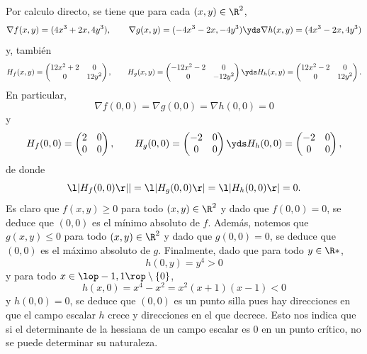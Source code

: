 \documentclass[a4,11pt]{aleph-examen}
\begin{document}
\begin{preguntas}
\begin{respuesta}
\begin{respuesta}
\begin{respuesta}
\begin{enumerate}
\begin{respuesta}
    Por calculo directo, se tiene que para cada $(x,y)\in\R^2$,
    \[
        \nabla f(x,y)=(4x^3+2x,4y^3),
        \qquad
        \nabla g(x,y)=(-4x^3-2x,-4y^3)
        \yds
        \nabla h(x,y)=(4x^3-2x,4y^3)
    \]
    y, también
    \[
        H_f(x,y)=
        \begin{pmatrix}
        12x^2+2&0\\
        0&12y^2\\
    \end{pmatrix},
    \qquad
    H_g(x,y)=
    \begin{pmatrix}
        -12x^2-2&0\\
        0&-12y^2\\
    \end{pmatrix}
    \yds
    H_h(x,y)=
    \begin{pmatrix}
        12x^2-2&0\\
        0&12y^2
    \end{pmatrix}.
    \]
    En particular,
    \[
        \nabla f(0,0)=\nabla g(0,0)=\nabla h(0,0)=0
    \]
    y
    \[
        H_f(0,0)=
        \begin{pmatrix}
        2&0\\
        0&0\\
    \end{pmatrix},
    \qquad
    H_g(0,0)=
    \begin{pmatrix}
        -2&0\\
        0&0\\
    \end{pmatrix}
    \yds
    H_h(0,0)=
    \begin{pmatrix}
        -2&0\\
        0&0
    \end{pmatrix},
    \]
    de donde
    \[
        \l|H_f(0,0)\r||=\l|H_g(0,0)\r|=\l|H_h(0,0)\r|=0.
    \]
    Es claro que $f(x,y)\geq 0$ para todo $(x,y)\in\R^2$ y dado que $f(0,0)=0$, se deduce que $(0,0)$ es el mínimo absoluto de $f$. Además, notemos que $g(x,y)\leq 0$ para todo $(x,y)\in\R^2$ y dado que $g(0,0)=0$, se deduce que $(0,0)$ es el máximo absoluto de $g$. Finalmente, dado que para todo $y\in\R*$,
    \[
        h(0,y)=y^4>0
    \]
    y para todo $x\in\lop-1,1\rop\setminus\{0\}$,
    \[
        h(x,0)=x^4-x^2=x^2(x+1)(x-1)<0
    \]
    y $h(0,0)=0$, se deduce que $(0,0)$ es un punto silla pues hay direcciones en que el campo escalar $h$ crece y direcciones en el que decrece. Esto nos indica que si el determinante de la hessiana de un campo escalar es 0 en un punto crítico, no se puede determinar su naturaleza.
\end{respuesta}


\end{enumerate}
\end{respuesta}
\end{respuesta}
\end{respuesta}
\end{preguntas}
\end{document}

